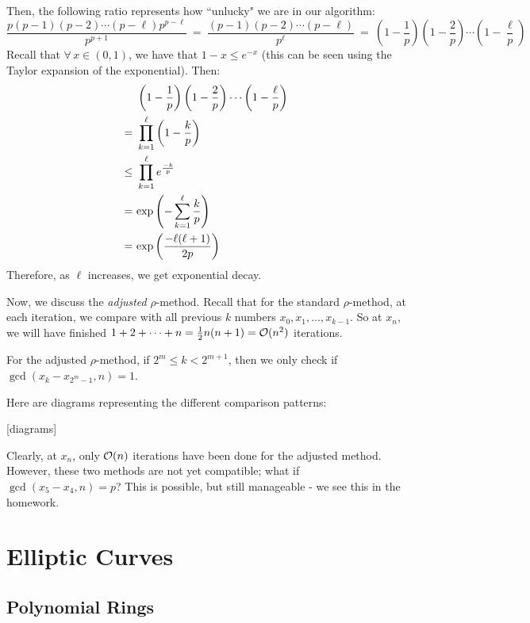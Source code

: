 \documentclass{article}
\begin{document}
Then, the following ratio represents how ``unlucky" we are in our algorithm:
\begin{equation*}
    \frac{p(p-1)(p-2)\cdots(p-\ell)p^{p-\ell}}{p^{p+1}}
    \ = \ \frac{(p-1)(p-2)\cdots(p-\ell)}{p^{\ell}}
    \ = \ \left( 1-\frac{1}{p} \right)\left( 1-\frac{2}{p} \right)
    \cdots\left( 1-\frac{\ell}{p} \right)
\end{equation*}
Recall that $ \forall \, x \in (0, 1) $, we have that $ 1-x \leq e^{-x} $
(this can be seen using the Taylor expansion of the exponential).
Then:
\begin{align*}
    & \left( 1-\frac{1}{p} \right)\left( 1-\frac{2}{p} \right)
    \cdots\left( 1-\frac{\ell}{p} \right) \\
    = \ & \prod_{k=1}^{\ell} \left( 1 - \frac{k}{p} \right) \\
    \leq \ & \prod_{k=1}^{\ell} e^{\frac{-k}{p}} \\
    = \ & \textrm{exp}\left( -\displaystyle\sum_{k=1}^{\ell}\dfrac{k}{p} \right) \\
    = \ & \textrm{exp}\left( \dfrac{-\ell(\ell+1)}{2p} \right)
\end{align*}
Therefore, as $ \ell $ increases, we get exponential decay.

Now, we discuss the \textit{adjusted} $ \rho $-method.
Recall that for the standard $ \rho $-method, at each iteration, we compare with
all previous $ k $ numbers $ x_{0}, x_{1}, \dots, x_{k-1} $.
So at $ x_{n} $, we will have finished $ 1+2+\dots+n = \frac{1}{2}n(n+1) = \mathcal{O}(n^{2}) $
iterations.

For the adjusted $ \rho $-method, if $ 2^{m} \leq k < 2^{m+1} $, then we only check if
$ \gcd(x_{k}-x_{2^{m}-1}, n) = 1 $.

Here are diagrams representing the different comparison patterns:

[diagrams]

Clearly, at $ x_{n} $, only $ \mathcal{O}(n) $ iterations have been done for the adjusted method.
However, these two methods are not yet compatible; what if $ \gcd(x_{5} - x_{4}, n) = p $?
This is possible, but still manageable - we see this in the homework.

\newpage
\section{Elliptic Curves}
\subsection{Polynomial Rings}
\end{document}
